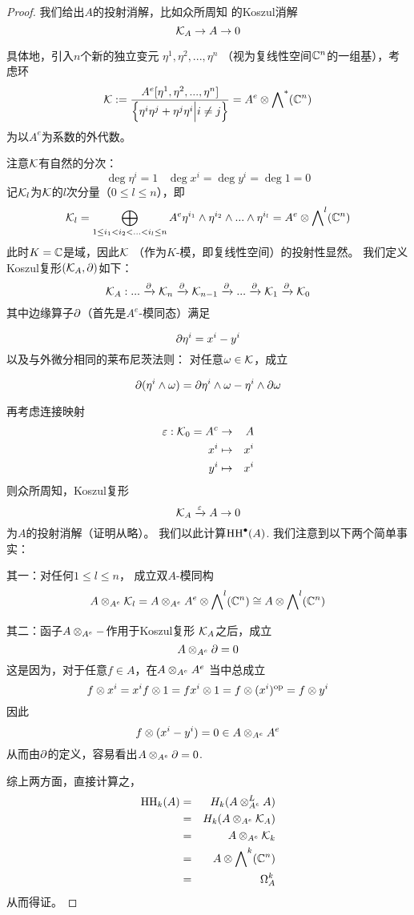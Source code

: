 \begin{proof}

我们给出$A$的投射消解，比如众所周知
的Koszul消解$$\mathcal{K}_A\to A\to 0$$

具体地，引入$n$个新的独立变元
$\eta^1,\eta^2,...,\eta^n$
（视为复线性空间$\mathbb{C}^n$的一组基），考虑环
$$\mathcal{K}:=\frac{A^e[\eta^1,\eta^2,...,\eta^n]}
               {\Big\{ \eta^i\eta^j+\eta^j\eta^i \Big| i\neq j \Big\}}
         =A^e\otimes\bigwedge\nolimits^ *(\mathbb{C}^n)$$
为以$A^e$为系数的外代数。

注意$\mathcal{K}$有自然的分次：
$$\deg\eta^i=1\,\,\,\,\,\deg x^i=\deg y^i=\deg 1=0$$
记$\mathcal{K}_l$为$\mathcal{K}$的$l$次分量（$0\leq l\leq n$），即
$$
\mathcal{K}_l=\bigoplus_{1\leq {i_1}<{i_2}<...<{i_l}\leq n}
          A^e\eta^{i_1}\wedge\eta^{i_2}\wedge...\wedge\eta^{i_l}
        =A^e\otimes\bigwedge\nolimits^ l(\mathbb{C}^n)$$
此时$K=\mathbb{C}$是域，因此$\mathcal{K}$
（作为$K$-模，即复线性空间）的投射性显然。
我们定义Koszul复形$(\mathcal{K}_A,\partial)$如下：
$$\mathcal{K}_A:...\xrightarrow{\partial} \mathcal{K}_n\xrightarrow{\partial}\mathcal{K}_{n-1}
\xrightarrow{\partial}...\xrightarrow{\partial}\mathcal{K}_1\xrightarrow{\partial}\mathcal{K}_0$$
其中边缘算子$\partial$（首先是$A^e$-模同态）满足

$$\partial\eta^i= x^i-y^i$$
以及与外微分相同的莱布尼茨法则：
对任意$\omega\in\mathcal{K}$，成立

$$\partial(\eta^i\wedge\omega)=
\partial\eta^i\wedge\omega-\eta^i\wedge\partial\omega$$

再考虑连接映射
\begin{eqnarray*}
\varepsilon:\mathcal{K}_0=A^c&\to& A\\
x^i&\mapsto&x^i\\
y^i&\mapsto&x^i\\
\end{eqnarray*}
则众所周知，Koszul复形
$$\mathcal{K}_A\xrightarrow{\varepsilon} A\to 0$$
为$A$的投射消解（证明从略）。
我们以此计算$\operatorname{HH}^{\bullet}(A)$.
我们注意到以下两个简单事实：

其一：对任何$1\leq l\leq n$，
成立双$A$-模同构
$$A\otimes_{A^e}\mathcal{K}_l=
A\otimes_{A^e}A^e\otimes\bigwedge\nolimits^ l(\mathbb{C}^n)
\cong A\otimes\bigwedge\nolimits^ l(\mathbb{C}^n)$$

其二：函子$A\otimes_{A^e}-$作用于Koszul复形
$\mathcal{K}_A$之后，成立
$$A\otimes_{A^e}\partial=0$$
这是因为，对于任意$f\in A$，在$A\otimes_{A^e}A^e$
当中总成立
$$f\otimes x^i=x^if\otimes 1
=fx^i\otimes 1=f\otimes (x^i)^{\text{op}}=f\otimes y^i$$
因此
$$f\otimes(x^i-y^i)=0\in
A\otimes_{A^e}A^e$$
从而由$\partial$的定义，容易看出$A\otimes_{A^e}\partial=0$.\vs

综上两方面，直接计算之，
\begin{eqnarray*}
\operatorname{HH}_k(A)&=&H_k(A\otimes_{A^e}^LA)\\
&=&H_k(A\otimes_{A^e}\mathcal{K}_A)\\
&=&A\otimes_{A^e}\mathcal{K}_k\\
&=&A\otimes\bigwedge\nolimits^ k(\mathbb{C}^n)\\
&=&\Omega^k_A
\end{eqnarray*}
从而得证。
\end{proof}

